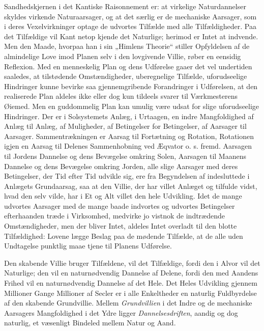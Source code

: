 \documentclass[12pt,a4paper]{book}
\begin{document}
Sandhedskjernen i det Kantiske Raisonnement er: at virkelige Naturdannelser
skyldes virkende Naturaarsager, og at det særlig er de mechaniske Aarsager, som
i deres Vexelvirkninger optage de udvortes Tilfælde med alle Tilfældigheder.
Paa det Tilfældige vil Kant netop kjende det Naturlige; herimod er Intet at
indvende. Men den Maade, hvorpaa han i sin „Himlens Theorie“ stiller
Opfyldelsen af de almindelige Love imod Planen selv i den lovgivende Villie,
røber en eensidig Reflexion. Med en menneskelig Plan og dens Udførelse gaaer
det vel undertiden saaledes, at tilstødende Omstændigheder, uberegnelige
Tilfælde, uforudseelige Hindringer kunne bevirke saa gjennemgribende
Forandringer i Udførelsen, at den realiserede Plan aldeles ikke eller dog kun
tildeels svarer til Værkmesterens Øiemed. Men en guddommelig Plan kan umulig
være udsat for slige uforudseelige Hindringer.
Der er i Solsystemets Anlæg, i Urtaagen, en indre Mangfoldighed af Anlæg til
Anlæg, af Muligheder, af Betingelser for Betingelser, af Aarsager til Aarsager.
Sammentrækningen er Aarsag til Fortætning og Rotation, Rotationen igjen en
Aarsag til Delenes Sammenhobning ved Æqvator o. s. fremd. Aarsagen til Jordens
Dannelse og dens Bevægelse omkring Solen, Aarsagen til Maanens Dannelse og dens
Bevægelse omkring Jorden, alle slige Aarsager med deres Betingelser, der Tid
efter Tid udvikle sig, ere fra Begyndelsen af indesluttede i Anlægets
Grundaarsag, saa at den Villie, der har villet Anlæget og tilfulde vidst, hvad
den selv vilde, har i Et og Alt villet den hele Udvikling. Idet de mange
udvortes Aarsager med de mange baade indvortes og udvortes Betingelser
efterhaanden træde i Virksomhed, medvirke jo vistnok de indtrædende
Omstændigheder, men der bliver Intet, aldeles Intet overladt til den blotte
Tilfældighed: Lovene lægge Beslag paa de mødende Tilfælde, at de alle uden
Undtagelse punktlig maae tjene til Planens Udførelse.

Den skabende Villie bruger Tilfældene, vil det Tilfældige, fordi den i Alvor
vil det Naturlige; den vil en naturnødvendig Dannelse af Delene, fordi den med
Aandens Frihed vil en naturnødvendig Dannelse af det Hele. Det Heles Udvikling
gjennem Millioner Gange Millioner af Secler er i alle Enkeltheder en naturlig
Fuldbyrdelse af den skabende Grundvillie. Mellem \emph{Grundvillien} i det
Indre og de mechaniske Aarsagers Mangfoldighed i det Ydre ligger
\emph{Dannelsesdriften}, aandig og dog naturlig, et væsenligt Bindeled mellem
Natur og Aand.
\end{document}
